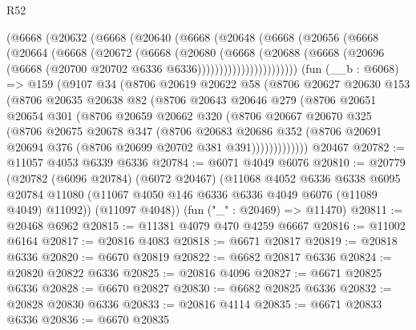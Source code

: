 \begin{lexlean}{R52}
\begin{coremodule}
          (@6668
            (@20632
              (@6668
                (@20640
                  (@6668
                    (@20648
                      (@6668
                        (@20656
                          (@6668
                            (@20664
                              (@6668
                                (@20672
                                  (@6668
                                    (@20680
                                      (@6668
                                        (@20688
                                          (@6668
                                            (@20696
                                              (@6668
                                                (@20700 @20702 @6336 @6336)))))))))))))))))))))))
    (fun (__b : @6068) =>
    @159
      (@9107
        @34
        (@8706
          @20619
          @20622
          @58
          (@8706
            @20627
            @20630
            @153
            (@8706
              @20635
              @20638
              @82
              (@8706
                @20643
                @20646
                @279
                (@8706
                  @20651
                  @20654
                  @301
                  (@8706
                    @20659
                    @20662
                    @320
                    (@8706
                      @20667
                      @20670
                      @325
                      (@8706
                        @20675
                        @20678
                        @347
                        (@8706
                          @20683
                          @20686
                          @352
                          (@8706 @20691 @20694 @376 (@8706 @20699 @20702 @381 @391)))))))))))))
    @20467
@20782 := @11057 @4053 @6339 @6336
@20784 := @6071 @4049 @6076
@20810 := @20779
    (@20782
      (@6096 @20784)
      (@6072 @20467)
      (@11068
        @4052
        @6336
        @6338
        @6095
        @20784
        @11080
        (@11067 @4050 @146 @6336 @6336 @4049 @6076 (@11089 @4049) @11092))
      (@11097 @4048))
    (fun ("_" : @20469) => @11470)
@20811 := @20468 @6962
@20815 := @11381 @4079 @470 @4259 @6667
@20816 := @11002 @6164
@20817 := @20816 @4083
@20818 := @6671 @20817
@20819 := @20818 @6336
@20820 := @6670 @20819
@20822 := @6682 @20817 @6336
@20824 := @20820 @20822 @6336
@20825 := @20816 @4096
@20827 := @6671 @20825 @6336
@20828 := @6670 @20827
@20830 := @6682 @20825 @6336
@20832 := @20828 @20830 @6336
@20833 := @20816 @4114
@20835 := @6671 @20833 @6336
@20836 := @6670 @20835

\end{coremodule}
\end{lexlean}
